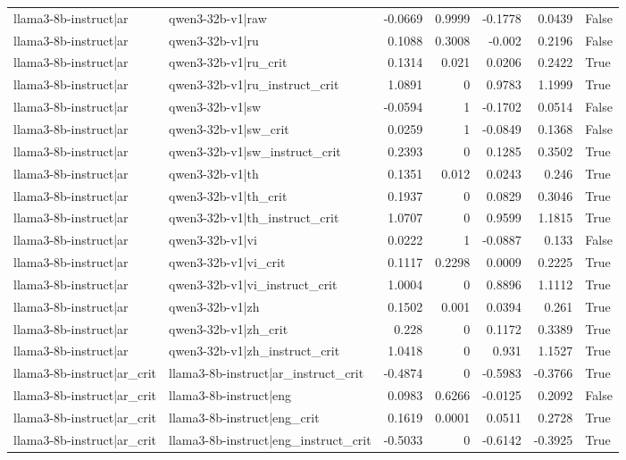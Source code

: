 \begin{table}
\begin{tabular}{l l r r r r l}
llama3-8b-instruct|ar & qwen3-32b-v1|raw & -0.0669 & 0.9999 & -0.1778 & 0.0439 & False \\
llama3-8b-instruct|ar & qwen3-32b-v1|ru & 0.1088 & 0.3008 & -0.002 & 0.2196 & False \\
llama3-8b-instruct|ar & qwen3-32b-v1|ru_crit & 0.1314 & 0.021 & 0.0206 & 0.2422 & True \\
llama3-8b-instruct|ar & qwen3-32b-v1|ru_instruct_crit & 1.0891 & 0 & 0.9783 & 1.1999 & True \\
llama3-8b-instruct|ar & qwen3-32b-v1|sw & -0.0594 & 1 & -0.1702 & 0.0514 & False \\
llama3-8b-instruct|ar & qwen3-32b-v1|sw_crit & 0.0259 & 1 & -0.0849 & 0.1368 & False \\
llama3-8b-instruct|ar & qwen3-32b-v1|sw_instruct_crit & 0.2393 & 0 & 0.1285 & 0.3502 & True \\
llama3-8b-instruct|ar & qwen3-32b-v1|th & 0.1351 & 0.012 & 0.0243 & 0.246 & True \\
llama3-8b-instruct|ar & qwen3-32b-v1|th_crit & 0.1937 & 0 & 0.0829 & 0.3046 & True \\
llama3-8b-instruct|ar & qwen3-32b-v1|th_instruct_crit & 1.0707 & 0 & 0.9599 & 1.1815 & True \\
llama3-8b-instruct|ar & qwen3-32b-v1|vi & 0.0222 & 1 & -0.0887 & 0.133 & False \\
llama3-8b-instruct|ar & qwen3-32b-v1|vi_crit & 0.1117 & 0.2298 & 0.0009 & 0.2225 & True \\
llama3-8b-instruct|ar & qwen3-32b-v1|vi_instruct_crit & 1.0004 & 0 & 0.8896 & 1.1112 & True \\
llama3-8b-instruct|ar & qwen3-32b-v1|zh & 0.1502 & 0.001 & 0.0394 & 0.261 & True \\
llama3-8b-instruct|ar & qwen3-32b-v1|zh_crit & 0.228 & 0 & 0.1172 & 0.3389 & True \\
llama3-8b-instruct|ar & qwen3-32b-v1|zh_instruct_crit & 1.0418 & 0 & 0.931 & 1.1527 & True \\
llama3-8b-instruct|ar_crit & llama3-8b-instruct|ar_instruct_crit & -0.4874 & 0 & -0.5983 & -0.3766 & True \\
llama3-8b-instruct|ar_crit & llama3-8b-instruct|eng & 0.0983 & 0.6266 & -0.0125 & 0.2092 & False \\
llama3-8b-instruct|ar_crit & llama3-8b-instruct|eng_crit & 0.1619 & 0.0001 & 0.0511 & 0.2728 & True \\
llama3-8b-instruct|ar_crit & llama3-8b-instruct|eng_instruct_crit & -0.5033 & 0 & -0.6142 & -0.3925 & True \\

\end{tabular}
\end{table}
